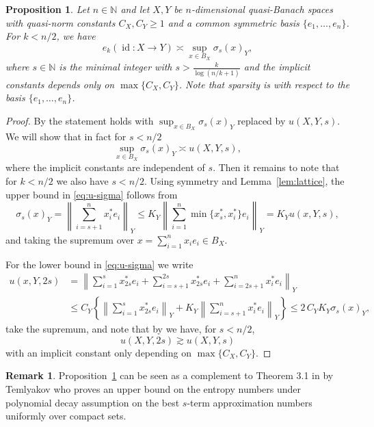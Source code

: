\documentclass[a4paper,12pt]{article}
\newtheorem{prop}[thm]{Proposition}
\theoremstyle{definition}
\newtheorem{remark}{Remark}
\newcommand{\IN}{\mathbb{N}}
\DeclareMathOperator{\id}{id}
\begin{document}
\begin{prop}\label{pro:entropy-sparse}
Let $n\in\IN$ and let $X,Y$ be $n$-dimensional quasi-Banach spaces with quasi-norm constants $C_X,C_Y\ge 1$ and a common symmetric basis $\{e_1,\dots,e_n\}$. For $k<n/2$, we have
\[
e_k(\id\colon X\to Y)
\asymp \sup_{x\in B_X}\sigma_s(x)_Y,
\]
where $s\in\IN$ is the minimal integer with $s>\frac{k}{\log(n/k+1)}$ and the implicit constants depends only on $\max\{C_X,C_Y\}$. Note that sparsity is with respect to the basis $\{e_1,\dots,e_n\}$.
\end{prop}
\begin{proof}
By \cite[Section 4, Theorem 2]{EN98} the statement holds with $\sup_{x\in B_X}\sigma_s(x)_Y$ replaced by $u(X,Y,s)$. We will show that in fact for $s<n/2$
\begin{equation} \label{eq:u-sigma}
\sup_{x\in B_X}\sigma_s(x)_Y\asymp u(X,Y,s),
\end{equation}
where the implicit constants are independent of $s$. Then it remains to note that for $k<n/2$ we also have $s<n/2$. Using symmetry and Lemma~\ref{lem:lattice}, the upper bound in \eqref{eq:u-sigma} follows from
\[
\sigma_s(x)_Y
=\left\|\sum_{i=s+1}^{n} x_{i}^* e_i \right\|_Y
\le K_Y\left\|\sum_{i=1}^{n} \min\{x_s^*,x_{i}^*\} e_i \right\|_Y
= K_Y u(x,Y,s),
\]
and taking the supremum over $x=\sum_{i=1}^{n}x_i e_i\in B_X$.

For the lower bound in \eqref{eq:u-sigma} we write
\begin{align*}
u(x,Y,2s)&=\left\|\sum_{i=1}^s x_{2s}^* e_i + \sum_{i=s+1}^{2s} x_{2s}^* e_i + \sum_{i=2s+1}^{n} x_{i}^* e_i\right\|_Y\\
&\le C_Y\left\{\left\|\sum_{i=1}^s x_{2s}^* e_i \right\|_Y + K_Y\left\| \sum_{i=s+1}^{n} x_{i}^* e_i \right\|_Y\right\}\le 2\,C_YK_Y \sigma_s(x)_Y,
\end{align*}
take the supremum, and note that by \cite[Section 4, Lemma 4 (i)]{EN98} we have, for $s<n/2$, 
\begin{equation} \label{eq:u-doubling}
u(X,Y,2s)\gtrsim u(X,Y,s)
\end{equation}
with an implicit constant only depending on $\max\{C_X,C_Y\}$.

\end{proof}

\begin{remark}\label{rem:temlyakov}
Proposition~\ref{pro:entropy-sparse} can be seen as a complement to Theorem 3.1 in \cite{Tem13} by Temlyakov who proves an upper bound on the entropy numbers under polynomial decay assumption on the best $s$-term approximation numbers uniformly over compact sets.
\end{remark}
\end{document}
